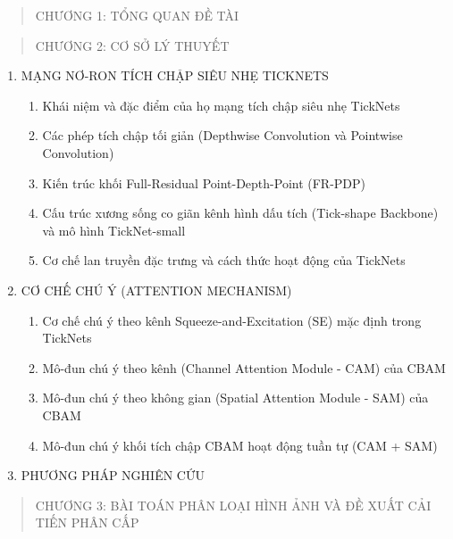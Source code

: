 \documentclass[
]{article}
\begin{document}
\begin{quote}
CHƯƠNG 1: TỔNG QUAN ĐỀ TÀI
\end{quote}

\begin{quote}
CHƯƠNG 2: CƠ SỞ LÝ THUYẾT
\end{quote}

\begin{enumerate}
\def\labelenumi{2.\arabic{enumi}.}
\item
  MẠNG NƠ-RON TÍCH CHẬP SIÊU NHẸ TICKNETS
  \begin{enumerate}
  \def\labelenumii{2.1.\arabic{enumii}.}
  \item
    Khái niệm và đặc điểm của họ mạng tích chập siêu nhẹ TickNets
  \item
    Các phép tích chập tối giản (Depthwise Convolution và Pointwise Convolution)
  \item
    Kiến trúc khối Full-Residual Point-Depth-Point (FR-PDP)
  \item
    Cấu trúc xương sống co giãn kênh hình dấu tích (Tick-shape Backbone) và mô hình TickNet-small
  \item
    Cơ chế lan truyền đặc trưng và cách thức hoạt động của TickNets
  \end{enumerate}
\item
  CƠ CHẾ CHÚ Ý (ATTENTION MECHANISM)
  \begin{enumerate}
  \def\labelenumii{2.2.\arabic{enumii}.}
  \item
    Cơ chế chú ý theo kênh Squeeze-and-Excitation (SE) mặc định trong TickNets
  \item
    Mô-đun chú ý theo kênh (Channel Attention Module - CAM) của CBAM
  \item
    Mô-đun chú ý theo không gian (Spatial Attention Module - SAM) của CBAM
  \item
    Mô-đun chú ý khối tích chập CBAM hoạt động tuần tự (CAM + SAM)
  \end{enumerate}
\item
  PHƯƠNG PHÁP NGHIÊN CỨU
\end{enumerate}

\begin{quote}
CHƯƠNG 3: BÀI TOÁN PHÂN LOẠI HÌNH ẢNH VÀ ĐỀ XUẤT CẢI TIẾN PHÂN CẤP
\end{quote}
\end{document}
